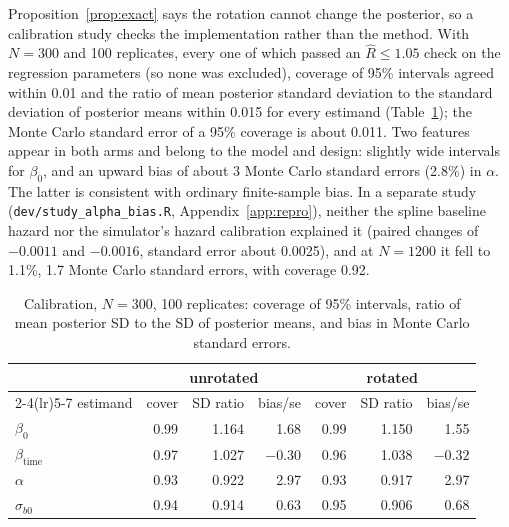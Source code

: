 Proposition~\ref{prop:exact} says the rotation cannot change the posterior,
so a calibration study checks the implementation rather than the method.
With $N = 300$ and 100 replicates, every one of which passed an $\hat R
\leq 1.05$ check on the regression parameters (so none was excluded),
coverage of 95\% intervals agreed within
0.01 and the ratio of mean posterior standard deviation to the standard
deviation of posterior means within 0.015 for every estimand
(Table~\ref{tab:cal}); the Monte Carlo standard error of a 95\% coverage
is about 0.011. Two features appear in both arms and belong to the model
and design: slightly wide intervals for $\beta_0$, and an upward bias of
about 3 Monte Carlo standard errors (2.8\%) in $\alpha$. The latter is
consistent with ordinary finite-sample bias. In a separate study
(\texttt{dev/study\_alpha\_bias.R}, Appendix~\ref{app:repro}), neither the
spline baseline hazard nor the simulator's hazard calibration explained
it (paired changes of $-0.0011$
and $-0.0016$, standard error about 0.0025), and at $N = 1200$ it fell to
1.1\%, 1.7 Monte Carlo standard errors, with coverage 0.92.

\begin{table}[t]
\centering
\caption{Calibration, $N = 300$, 100 replicates: coverage of 95\%
intervals, ratio of mean posterior SD to the SD of posterior means, and
bias in Monte Carlo standard errors.}
\label{tab:cal}
\small
\begin{tabular}{l rrr rrr}
\toprule
& \multicolumn{3}{c}{unrotated} & \multicolumn{3}{c}{rotated} \\
\cmidrule(lr){2-4}\cmidrule(lr){5-7}
estimand & cover & SD ratio & bias/se & cover & SD ratio & bias/se \\
\midrule
$\beta_0$           & 0.99 & 1.164 &  1.68 & 0.99 & 1.150 &  1.55 \\
$\beta_{\mathrm{time}}$ & 0.97 & 1.027 & $-0.30$ & 0.96 & 1.038 & $-0.32$ \\
$\alpha$            & 0.93 & 0.922 &  2.97 & 0.93 & 0.917 &  2.97 \\
$\sigma_{b0}$       & 0.94 & 0.914 &  0.63 & 0.95 & 0.906 &  0.68 \\
\bottomrule
\end{tabular}
\end{table}
